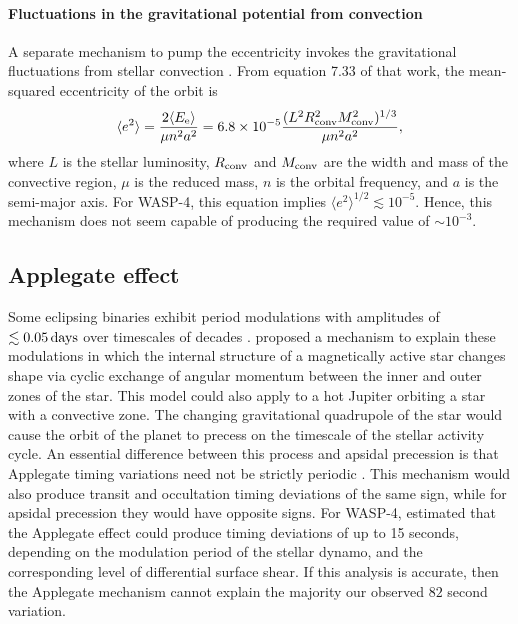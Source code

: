 \documentclass[12pt,twocolumn,tighten]{aastex62}
\begin{document}
\paragraph{Fluctuations in the gravitational potential from convection}
A separate mechanism to pump the eccentricity invokes the
gravitational fluctuations from stellar convection \citep[][Section
7]{phinney_pulsars_1992}.  From equation 7.33 of that work, the
mean-squared eccentricity of the orbit is
\begin{equation}
  \langle e^2 \rangle =
  \frac{ 2 \langle E_{\rm e} \rangle }{\mu n^2 a^2}
  = 6.8\times10^{-5}
  \frac{(L^2 R_{\rm conv}^2 M_{\rm conv}^2)^{1/3}}{\mu n^2 a^2},
\end{equation}
where $L$ is the stellar luminosity, $R_{\rm conv}$ and $M_{\rm conv}$
are the width and mass of the convective region, $\mu$ is the reduced
mass, $n$ is the orbital frequency, and $a$ is the semi-major axis.
For WASP-4, this equation implies $\langle e^2 \rangle^{1/2} \lesssim
10^{-5}$.  Hence, this mechanism does not seem capable of producing
the required value of $\sim$$10^{-3}$.


\subsection{Applegate effect}
Some eclipsing binaries exhibit period modulations with amplitudes of
$\lesssim 0.05\,{\rm days}$ over timescales of decades \citep[{\it
    e.g.},][]{soderhjelm_geometry_1980,hall_relation_1989}.
\citet{applegate_mechanism_1992} proposed a mechanism to explain these
modulations in which the internal structure of a magnetically active
star changes shape via cyclic exchange of angular momentum between the
inner and outer zones of the star.  This model could also apply to a
hot Jupiter orbiting a star with a convective zone.  The changing
gravitational quadrupole of the star would cause the orbit of the
planet to precess on the timescale of the stellar activity cycle.  An
essential difference between this process and apsidal precession is
that Applegate timing variations need not be strictly periodic
\citep[{\it e.g.},][Figure~12]{soderhjelm_geometry_1980}. This
mechanism would also produce transit and occultation timing deviations
of the same sign, while for apsidal precession they would have
opposite signs.  For WASP-4, \citet{watson_orbital_2010} estimated
that the Applegate effect could produce timing deviations of up to 15
seconds, depending on the modulation period of the stellar dynamo, and
the corresponding level of differential surface shear.  If this
analysis is accurate, then the Applegate mechanism cannot explain the
majority our observed $82$ second variation.
\end{document}
